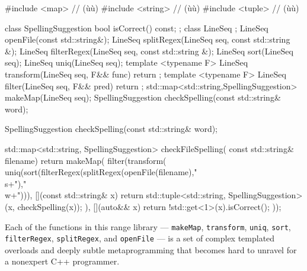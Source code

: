 \begin{emcppshiddenlisting}[emcppsbatch={e13,e14},emcppsstandards=c++14]
#include <map>     // (ù{}ù)
#include <string>  // (ù{}ù)
#include <tuple>   // (ù{}ù)

class SpellingSuggestion {
    bool isCorrect() const;
};
class LineSeq {};
LineSeq openFile(const std::string&);
LineSeq splitRegex(LineSeq seq, const std::string &);
LineSeq filterRegex(LineSeq seq, const std::string &);
LineSeq sort(LineSeq seq);
LineSeq uniq(LineSeq seq);
template <typename F>
LineSeq transform(LineSeq seq, F&& func) { return {}; }
template <typename F>
LineSeq filter(LineSeq seq, F&& pred) { return {}; }
std::map<std::string,SpellingSuggestion> makeMap(LineSeq seq);
SpellingSuggestion checkSpelling(const std::string& word);
\end{emcppshiddenlisting}
\begin{emcppslisting}[emcppsbatch=e13]
SpellingSuggestion checkSpelling(const std::string& word);

std::map<std::string, SpellingSuggestion> checkFileSpelling(
                                                   const std::string& filename)
{
    return makeMap(
        filter(transform(
           uniq(sort(filterRegex(splitRegex(openFile(filename),"\\s+"),"\\w+"))),
        [](const std::string& x)
        {
            return std::tuple<std::string, SpellingSuggestion>(x,
                                                             checkSpelling(x));
        }
   ), [](auto&& x) { return !std::get<1>(x).isCorrect(); }));
}
\end{emcppslisting}


\noindent Each of the functions in this range library --- \lstinline!makeMap!,
\lstinline!transform!, \lstinline!uniq!, \lstinline!sort!, \lstinline!filterRegex!,
\lstinline!splitRegex!, and \lstinline!openFile! --- is a set of complex
templated overloads and deeply subtle metaprogramming that becomes hard
to unravel for a nonexpert C++ programmer. 

